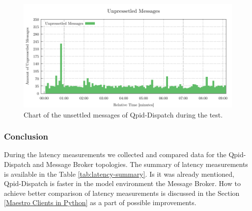 \begin{figure}[H]
	\centering
	\includegraphics[width=1\linewidth]{obrazky-figures/charts/multipoint-router-only-latency-routerLink.pdf}
	\caption{Chart of the unsettled messages of Qpid-Dispatch during the test.}
	\label{fig:latency-multiple-router-routerLink}
\end{figure}


\subsubsection*{Conclusion}
During the latency measurements we collected and compared data for the Qpid-Dispatch and Message Broker topologies. The summary of latency measurements is available in the Table \ref{tab:latency-summary}. Is it was already mentioned, Qpid-Dispatch is faster in the model environment the Message Broker. How to achieve better comparison of latency measurements is discussed in the Section \ref{Maestro Clients in Python} as a part of possible improvements.

